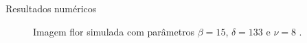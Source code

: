 \documentclass[10pt]{beamer}
\begin{document}
\begin{frame}{Resultados numéricos}
\begin{figure}[hbt]
	\caption{Imagem flor simulada com parâmetros $\beta = 15$, $\delta = 133$ e $\nu = 8$ .}
\label{cap_acf_fig15}
\endminipage\hfill
{}

\end{figure}
\end{frame}
\end{document}

